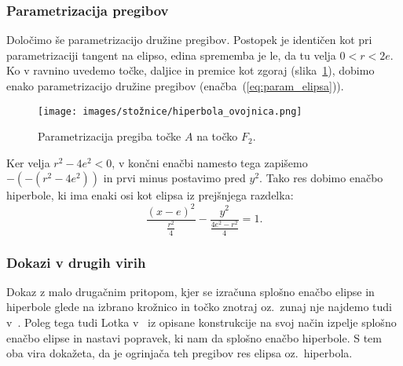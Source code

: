 \subsubsection*{Parametrizacija pregibov}

Določimo še parametrizacijo družine pregibov. Postopek je identičen kot pri parametrizaciji tangent na elipso, edina sprememba je le, da tu velja $0<r<2e$. Ko v ravnino uvedemo točke, daljice in premice kot zgoraj (slika~\ref{fig:enacba_hiperbole}), dobimo enako parametrizacijo družine pregibov (enačba~(\eqref{eq:param_elipsa})).
\begin{figure}[h]
    \centering
    \texttt{[image: images/stožnice/hiperbola\_ovojnica.png]}
    \caption[Enačba tangente na elipso]{Parametrizacija pregiba točke $A$ na točko $F_2$.}
    \label{fig:enacba_hiperbole}
\end{figure}

Ker velja $r^2-4e^2 < 0$, v končni enačbi namesto tega zapišemo $-(-(r^2-4e^2))$ in prvi minus postavimo pred $y^2$. Tako res dobimo enačbo hiperbole, ki ima enaki osi kot elipsa iz prejšnjega razdelka:
\begin{equation*}
    \frac{(x-e)^2}{\frac{r^2}{4}} - \frac{y^2}{\frac{4e^2-r^2}{4}} = 1.
\end{equation*}

\subsubsection*{Dokazi v drugih virih}

Dokaz z malo drugačnim pritopom, kjer se izračuna splošno enačbo elipse in hiperbole glede na izbrano krožnico in točko znotraj oz.\ zunaj nje najdemo tudi v~\cite[str.\ 204--206]{smith2003}. Poleg tega tudi Lotka v~\cite{lotka1907} iz opisane konstrukcije na svoj način izpelje splošno enačbo elipse in nastavi popravek, ki nam da splošno enačbo hiperbole. S tem oba vira dokažeta, da je ogrinjača teh pregibov res elipsa oz.\ hiperbola.